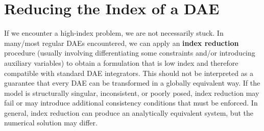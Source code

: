 

\section{Reducing the Index of a DAE}

If we encounter a high-index problem, we are not necessarily stuck. In many/most regular DAEs encountered, we can apply an \textbf{index reduction} procedure (usually involving differentiating some constraints and/or introducing auxiliary variables) to obtain a formulation that is low index and therefore compatible with standard DAE integrators. This should not be interpreted as a guarantee that every DAE can be transformed in a globally equivalent way. If the model is structurally singular, inconsistent, or poorly posed, index reduction may fail or may introduce additional consistency conditions that must be enforced. In general, index reduction can produce an analytically equivalent system, but the numerical solution may differ.

